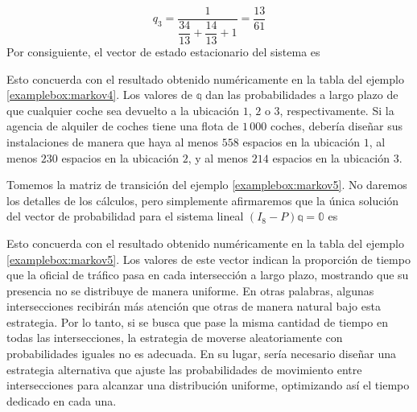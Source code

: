\begin{examplebox}{}{}
    $$q_3 = \frac{1}{\dfrac{34}{13} + \dfrac{14}{13} + 1} = \frac{13}{61}$$
    Por consiguiente, el vector de estado estacionario del sistema es
    \begin{matrizn}
    \end{matrizn}
    Esto concuerda con el resultado obtenido numéricamente en la tabla del ejemplo \ref{examplebox:markov4}. Los valores de $\mathbb{q}$ dan las probabilidades a largo plazo de que cualquier coche sea devuelto a la ubicación $1$, $2$ o $3$, respectivamente. Si la agencia de alquiler de coches tiene una flota de $1 \, 000$ coches, debería diseñar sus instalaciones de manera que haya al menos $558$ espacios en la ubicación $1$, al menos $230$ espacios en la ubicación $2$, y al menos $214$ espacios en la ubicación $3$.
\end{examplebox}

\begin{examplebox}{}{}
    Tomemos la matriz de transición del ejemplo \ref{examplebox:markov5}. No daremos los detalles de los cálculos, pero simplemente afirmaremos que la única solución del vector de probabilidad para el sistema lineal $(I_8 - P)\mathbb{q} = \mathbb{0}$ es
    \begin{matrizn}
    \end{matrizn}
    Esto concuerda con el resultado obtenido numéricamente en la tabla del ejemplo \ref{examplebox:markov5}. Los valores de este vector indican la proporción de tiempo que la oficial de tráfico pasa en cada intersección a largo plazo, mostrando que su presencia no se distribuye de manera uniforme. En otras palabras, algunas intersecciones recibirán más atención que otras de manera natural bajo esta estrategia. Por lo tanto, si se busca que pase la misma cantidad de tiempo en todas las intersecciones, la estrategia de moverse aleatoriamente con probabilidades iguales no es adecuada. En su lugar, sería necesario diseñar una estrategia alternativa que ajuste las probabilidades de movimiento entre intersecciones para alcanzar una distribución uniforme, optimizando así el tiempo dedicado en cada una.
\end{examplebox}

